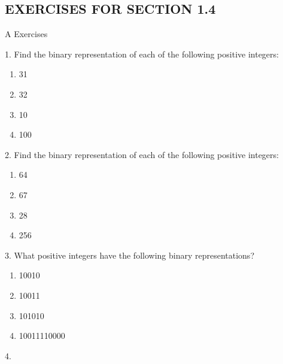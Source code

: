 \documentclass[10pt,]{book}
\theoremstyle{plain}
\theoremstyle{definition}
\begin{document}
\typeout{************************************************}
\typeout{************************************************}
\subsection[EXERCISES FOR SECTION 1.4 ]{EXERCISES FOR SECTION 1.4 }\label{exercises-1.4}
\hypertarget{exercisegroup-7}{}\typeout{************************************************}
\typeout{************************************************}
A Exercises%
\begin{exercisegroup}
\item[1.]\hypertarget{exercise-24}{} 
Find the binary representation of each of the following positive integers: 
\leavevmode%
\begin{enumerate}[label=(\alph*)]
\item\hypertarget{li-149}{} 31\item\hypertarget{li-150}{} 32\item\hypertarget{li-151}{}10\item\hypertarget{li-152}{}100 \end{enumerate}
\par\smallskip
\item[2.]\hypertarget{exercise-25}{} 
Find the binary representation of each of the following positive integers: 
\leavevmode%
\begin{enumerate}[label=(\alph*)]
\item\hypertarget{li-153}{} 64\item\hypertarget{li-154}{} 67\item\hypertarget{li-155}{}28\item\hypertarget{li-156}{}256 \end{enumerate}
\par\smallskip
\item[3.]\hypertarget{exercise-26}{} 
What positive integers have the following binary representations?
\leavevmode%
\begin{enumerate}[label=(\alph*)]
\item\hypertarget{li-157}{} 10010\item\hypertarget{li-158}{} 10011\item\hypertarget{li-159}{}101010\item\hypertarget{li-160}{}10011110000 \end{enumerate}
\par\smallskip
\item[4.]\hypertarget{exercise-27}{} 

\end{exercisegroup}
\end{document}
